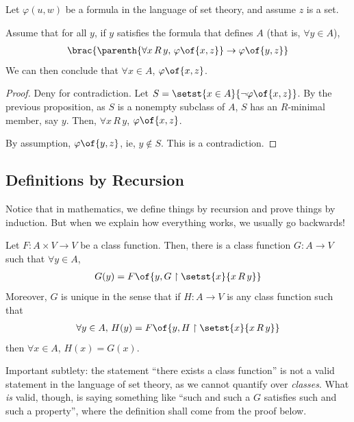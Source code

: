 \begin{boxtheorem}
    Let $\varphi(u, w)$ be a formula in the language of set theory, and assume $z$ is a set.

    Assume that for all $y$, if $y$ satisfies the formula that defines $A$ (that is, $\forall y \in A$),
    \begin{align*}
        \brac{\parenth{\forall x \, R \, y, \, \varphi\of{x, z}} \to \varphi\of{y, z}}
    \end{align*}
    We can then conclude that $\forall x \in A$, $\varphi\of{x, z}$.
\end{boxtheorem}
\begin{proof}
    Deny for contradiction. Let $S = \setst{x \in A}{\neg \varphi\of{x, z}}$. By the previous proposition, as $S$ is a nonempty subclass of $A$, $S$ has an $R$-minimal member, say $y$. Then, $\forall x \, R \, y$, $\varphi\of{x, z}$.

    By assumption, $\varphi\of{y, z}$, ie, $y \notin S$. This is a contradiction.
\end{proof}

\subsection{Definitions by Recursion}

Notice that in mathematics, we define things by recursion and prove things by induction. But when we explain how everything works, we usually go backwards!

\begin{boxtheorem}
    Let $F : A \times V \to V$ be a class function. Then, there is a class function $G : A \to V$ such that $\forall y \in A$,
    \begin{align*}
        G(y) = F\of{y, G \restriction \setst{x}{x \, R \, y}}
    \end{align*}
    Moreover, $G$ is unique in the sense that if $H : A \to V$ is any class function such that
    \begin{align*}
        \forall y \in A,\, H(y) = F\of{y, H \restriction \setst{x}{x \, R \, y}}
    \end{align*}
    then $\forall x \in A$, $H(x) = G(x)$.
\end{boxtheorem}
\begin{boxwarning}
    Important subtlety: the statement ``there exists a class function'' is not a valid statement in the language of set theory, as we cannot quantify over \textit{classes}. What \textit{is} valid, though, is saying something like ``such and such a $G$ satisfies such and such a property'', where the definition shall come from the proof below.
\end{boxwarning}

